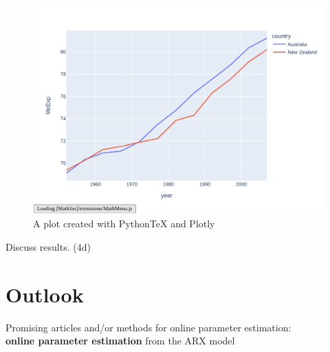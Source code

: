 \begin{figure}[h!]
\includegraphics{plotly}
\caption{\label{fig:plotly} A plot created with PythonTeX and Plotly}
\end{figure}
Discuss results.  (4d)

\chapter{Outlook}

Promising articles and/or methods for online parameter estimation: \\ 

\textbf{online parameter estimation} from the ARX model  \cite{tran2017state}

\cite{xia2018online}
\cite{wang2021augmented}